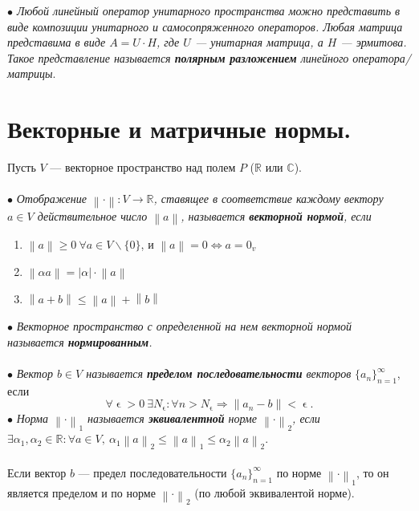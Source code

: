 \textit{$\bullet$ Любой линейный оператор унитарного пространства можно представить в виде композиции унитарного и самосопряженного операторов. Любая матрица представима в виде $A = U\cdot H$, где $U$ --- унитарная матрица, а $H$ --- эрмитова. Такое представление называется \textbf{полярным разложением} линейного оператора/матрицы}.






\section{Векторные и матричные нормы.}
Пусть $V$ --- векторное пространство над полем $P$ ($\mathbb{R}$ или $\mathbb{C}$).\\\\
$\bullet$ \textit{Отображение $\left \| \cdot  \right \|:V\rightarrow \mathbb{R}$, ставящее в соответствие каждому вектору $a\in V$ действительное число $\left \|a\right \|$, называется \textbf{векторной нормой}, если}
\begin{enumerate}
	\item $\left \|a\right \| \geqslant 0\ \forall a \in V\backslash\{0\}$, и $\left \|a\right \| = 0 \Leftrightarrow a = 0_v$
	\item $\left \|\alpha a\right \|=|\alpha|\cdot\left \|a\right \|$
	\item  $\left \|a+b\right \| \leqslant \left \|a\right \| + \left \|b\right \|$
\end{enumerate}
$\bullet$ \textit{Векторное пространство с определенной на нем векторной нормой называется \textbf{нормированным}.}\\\\
$\bullet$ \textit{Вектор $b\in V$ называется \textbf{пределом последовательности} векторов} $\{a_n\}^\infty_{n=1}$, если $$\forall\upvarepsilon >0\ \exists N_\upvarepsilon : \forall n > N_\upvarepsilon \Rightarrow \left \| a_n - b \right \| < \upvarepsilon. $$
$\bullet$ \textit{Норма $\left \| \cdot  \right \|_1$ называется \textbf{эквивалентной} норме $\left \| \cdot  \right \|_2$, если $\exists \alpha_1, \alpha_2\in \mathbb{R} : \forall a\in V,\ \alpha_1 \left \| a \right\|_2 \leqslant \left \| a \right\|_1\leqslant \alpha_2 \left \| a \right\|_2$}.\\\\
Если вектор $b$ --- предел последовательности $\{a_n\}^\infty_{n=1}$ по норме $\left \| \cdot \right \|_1$, то он является пределом и по норме $\left \| \cdot \right \|_2$ (по любой эквивалентой норме).\\\\ 
